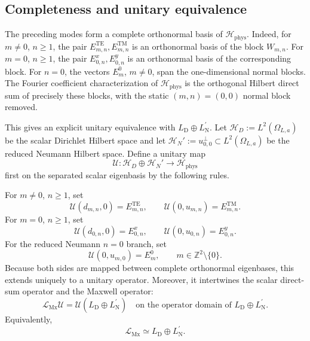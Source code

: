 \documentclass[11pt]{article}
\providecommand{\Z}{\mathbb{Z}}
\providecommand{\OmegaLa}{\Omega_{L,a}}
\providecommand{\Hphys}{\mathcal H_{\mathrm{phys}}}
\providecommand{\LMx}{\mathcal L_{\mathrm{Mx}}}
\providecommand{\LD}{L_{\mathrm D}}
\providecommand{\LNp}{L_{\mathrm N}^{\prime}}
\numberwithin{equation}{section}
\begin{document}
\subsection{Completeness and unitary equivalence}
\label{subsec:completeness-unitary-equivalence-section05}

The preceding modes form a complete orthonormal basis of \(\Hphys\).  Indeed,
for \(m\ne0\), \(n\geq1\), the pair
\(E^{\mathrm{TE}}_{m,n},E^{\mathrm{TM}}_{m,n}\) is an orthonormal basis of the
block \(W_{m,n}\).  For \(m=0\), \(n\geq1\), the pair
\(E^{x}_{0,n},E^{y}_{0,n}\) is an orthonormal basis of the corresponding
block.  For \(n=0\), the vectors \(E^0_m\), \(m\ne0\), span the one-dimensional
normal blocks.  The Fourier coefficient characterization of \(\Hphys\) is the
orthogonal Hilbert direct sum of precisely these blocks, with the static
\((m,n)=(0,0)\) normal block removed.

This gives an explicit unitary equivalence with \(\LD\oplus\LNp\).  Let
\(\mathcal H_D:=L^2(\OmegaLa)\) be the scalar Dirichlet Hilbert space and let
\(\mathcal H_N':=u_{0,0}^{\perp}\subset L^2(\OmegaLa)\) be the reduced Neumann
Hilbert space.  Define a unitary map
\begin{equation}
    \mathcal U:
    \mathcal H_D\oplus\mathcal H_N'
    \longrightarrow
    \Hphys
    \label{eq:unitary-U-def-section05}
\end{equation}
first on the separated scalar eigenbasis by the following rules.

For \(m\ne0\), \(n\geq1\), set
\begin{equation}
    \mathcal U(d_{m,n},0)=E^{\mathrm{TE}}_{m,n},
    \qquad
    \mathcal U(0,u_{m,n})=E^{\mathrm{TM}}_{m,n} .
    \label{eq:unitary-map-nonzero-m-section05}
\end{equation}
For \(m=0\), \(n\geq1\), set
\begin{equation}
    \mathcal U(d_{0,n},0)=E^{x}_{0,n},
    \qquad
    \mathcal U(0,u_{0,n})=E^{y}_{0,n} .
    \label{eq:unitary-map-zero-m-section05}
\end{equation}
For the reduced Neumann \(n=0\) branch, set
\begin{equation}
    \mathcal U(0,u_{m,0})=E^0_m,
    \qquad
    m\in\Z^2\setminus\{0\} .
    \label{eq:unitary-map-normal-branch-section05}
\end{equation}
Because both sides are mapped between complete orthonormal eigenbases, this
extends uniquely to a unitary operator.  Moreover, it intertwines the scalar
direct-sum operator and the Maxwell operator:
\begin{equation}
    \LMx\mathcal U
    =
    \mathcal U(\LD\oplus\LNp)
    \quad
    \text{on the operator domain of }\LD\oplus\LNp .
    \label{eq:intertwining-LMx-LD-LNp-section05}
\end{equation}
Equivalently,
\begin{equation}
    \boxed{
    \LMx
    \simeq
    \LD\oplus\LNp .
    }
    \label{eq:LMx-unitarily-equivalent-LD-LNp}
\end{equation}
\end{document}

